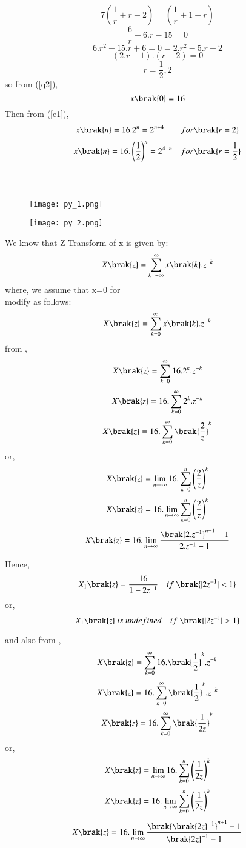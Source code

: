 \documentclass[beamer]{IEEEtran}
\theoremstyle{remark}
\begin{document}
\[7\left(\frac{1}{r}+r-2\right)=\left(\frac{1}{r}+1+r\right)\]
\[\frac{6}{r}+6.r-15=0\]
\[6.r^2-15.r+6=0=2.r^2-5.r+2\]
\[(2.r-1).(r-2)=0\]
\begin{equation}
\label{q3}
r=\frac{1}{2},2
\end{equation}
so from (\ref{q2}),
\[x\brak{0}=16\]
Then from (\ref{e1}),
\begin{align}
    \label{a11}
    x\brak{n}=16.2^{n}=2^{n+4}\qquad for \brak{r=2}
\end{align}
\begin{align}
    \label{a12}
    x\brak{n}=16.\left(\frac{1}{2}\right)^{n}=2^{4-n}\quad for \brak{r=\frac{1}{2}}
\end{align}\\\\

\begin{figure}[h]
    \centering
    \texttt{[image: py\_1.png]}
    \label{fig:enter-label}
\end{figure}

\begin{figure}[h]
    \centering
    \texttt{[image: py\_2.png]}
    \label{fig:enter-label}
\end{figure}

We know that Z-Transform of x is given by:
\begin{align}
\label{a13}
    X\brak{z}=\sum_{k=-\infty}^{\infty} x\brak{k}.z^{-k}
\end{align}
where, we assume that x=0   for \\
\brak{\ref{a13}} modify as follows:
\begin{align}
\label{a14}
    X\brak{z}=\sum_{k=0}^{\infty} x\brak{k}.z^{-k}
\end{align}
from \brak{\ref{a11}},
$$X\brak{z}=\sum_{k=0}^{\infty} 16.2^k.z^{-k}$$
$$X\brak{z}=16.\sum_{k=0}^{\infty} 2^k.z^{-k}$$
$$X\brak{z}=16.\sum_{k=0}^{\infty} \brak{\frac{2}{z}}^k$$
or,
$$X\brak{z}=\lim_{n\to\infty}16.\sum_{k=0}^{n} \left(\frac{2}{z}\right)^k$$
$$X\brak{z}=16.\lim_{n\to\infty}\sum_{k=0}^{n}
\left(\frac{2}{z}\right)^k$$
$$X\brak{z}=16.\lim_{n\to\infty} \frac{\brak{2.z^{-1}}^{n+1}-1}{2.z^{-1}-1}$$

Hence,
$$X_1\brak{z}=\frac{16}{1-2z^{-1}}\quad if\ \brak{|2z^{-1}|<1}$$
or,
$$X_1\brak{z}\ is\ undefined\quad if\ \brak{|2z^{-1}|>1}$$

and also from \brak{\ref{a12}},
$$X\brak{z}=\sum_{k=0}^{\infty} 16.\brak{\frac{1}{2}}^k.z^{-k}$$
$$X\brak{z}=16.\sum_{k=0}^{\infty} \brak{\frac{1}{2}}^k.z^{-k}$$
$$X\brak{z}=16.\sum_{k=0}^{\infty} \brak{\frac{1}{2z}}^k$$
or,
$$X\brak{z}=\lim_{n\to\infty}16.\sum_{k=0}^{n} \left(\frac{1}{2z}\right)^k$$
$$X\brak{z}=16.\lim_{n\to\infty}\sum_{k=0}^{n}
\left(\frac{1}{2z}\right)^k$$
$$X\brak{z}=16.\lim_{n\to\infty} \frac{\brak{\brak{2z}^{-1}}^{n+1}-1}{{\brak{2z}^{-1}}-1}$$
\end{document}
